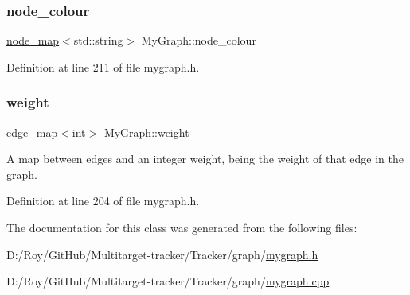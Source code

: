 \subsubsection{\texorpdfstring{node\+\_\+colour}{node\_colour}}
{\footnotesize\ttfamily \mbox{\hyperlink{classnode__map}{node\+\_\+map}}$<$std\+::string$>$ My\+Graph\+::node\+\_\+colour\hspace{0.3cm}{\ttfamily [protected]}}



Definition at line 211 of file mygraph.\+h.

\mbox{\label{class_my_graph_aa6e12f16153220780e9db1eb30112b34}} 
\subsubsection{\texorpdfstring{weight}{weight}}
{\footnotesize\ttfamily \mbox{\hyperlink{classedge__map}{edge\+\_\+map}}$<$int$>$ My\+Graph\+::weight\hspace{0.3cm}{\ttfamily [protected]}}

A map between edges and an integer weight, being the weight of that edge in the graph. 

Definition at line 204 of file mygraph.\+h.



The documentation for this class was generated from the following files\+:\begin{DoxyCompactItemize}
\item 
D\+:/\+Roy/\+Git\+Hub/\+Multitarget-\/tracker/\+Tracker/graph/\mbox{\hyperlink{mygraph_8h}{mygraph.\+h}}\item 
D\+:/\+Roy/\+Git\+Hub/\+Multitarget-\/tracker/\+Tracker/graph/\mbox{\hyperlink{mygraph_8cpp}{mygraph.\+cpp}}\end{DoxyCompactItemize}
